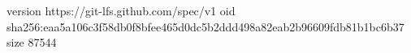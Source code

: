 version https://git-lfs.github.com/spec/v1
oid sha256:eaa5a106c3f58db0f8bfee465d0dc5b2ddd498a82eab2b96609fdb81b1bc6b37
size 87544
